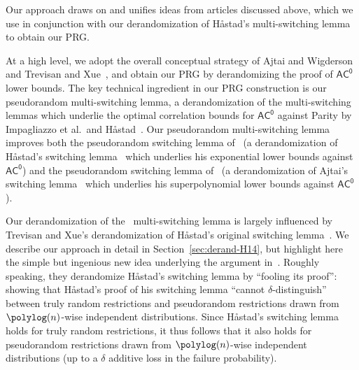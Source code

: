 \documentclass[11pt]{article}
\numberwithin{equation}{section}
\theoremstyle{definition}
\theoremstyle{plain}
\newcommand{\pparagraph}[1]{\medskip \noindent {\bf {#1}}}
\theoremstyle{plain}
\newcommand{\acz}{\mathsf{AC^0}}
\begin{document}
\pparagraph{Our approach.}  Our approach draws on and unifies ideas
%
{}from  %
%
articles \cite{AjtaiWigderson:85,TX13,HS16journal}  %
%
%
%
discussed above, which we use in conjunction with our derandomization of 
%
H{\aa}stad's multi-switching lemma~\cite{Has14} %
to obtain our PRG.

At a high level, we adopt the overall conceptual strategy of Ajtai and Wigderson~\cite{AjtaiWigderson:85} and Trevisan and Xue~\cite{TX13}, and obtain our PRG by derandomizing the proof of $\acz$ lower bounds.  The key technical ingredient in our PRG construction is our pseudorandom multi-switching lemma, a derandomization of the multi-switching lemmas which underlie the optimal correlation bounds for $\acz$ against {\sc Parity} %
by  %
Impagliazzo et al.~and H{\aa}stad~\cite{IMP12,Has14}.  Our pseudorandom multi-switching lemma improves both the pseudorandom switching lemma of~\cite{TX13} (a derandomization of H{\aa}stad's switching lemma~\cite{Hastad86} which underlies his exponential lower bounds against $\acz$) and the pseudorandom switching lemma of~\cite{AjtaiWigderson:85} (a derandomization of Ajtai's switching lemma~\cite{ajtai1983} which underlies his superpolynomial lower bounds against $\acz$).  


Our derandomization of the~\cite{Has14} multi-switching lemma is largely influenced by Trevisan and Xue's derandomization of H{\aa}stad's original switching lemma~\cite{Hastad86}.  We describe our approach in detail in Section~\ref{sec:derand-H14}, but highlight here the simple but ingenious new idea %
%
underlying the argument in~\cite{TX13}.   %
%
Roughly  %
speaking, they derandomize %
%
H{\aa}stad's  %
switching lemma by ``fooling its proof'':  showing that H{\aa}stad's proof of his switching lemma ``cannot $\delta$-distinguish'' between truly random restrictions and pseudorandom restrictions drawn from $\polylog(n)$-wise independent distributions.  Since H{\aa}stad's switching lemma holds for truly random restrictions, it thus follows that it also holds for pseudorandom restrictions drawn from $\polylog(n)$-wise independent distributions (up to a $\delta$ additive loss in the failure probability). 
\end{document}

